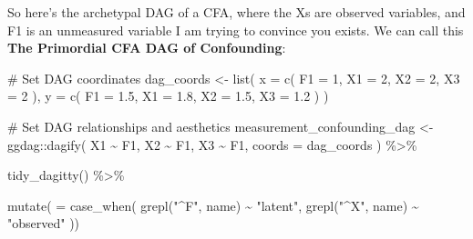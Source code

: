 \documentclass[
  letterpaper,
  DIV=11,
  numbers=noendperiod]{scrreprt}
\newenvironment{Shaded}{\begin{snugshade}}{\end{snugshade}}
\newcommand{\AttributeTok}[1]{\textcolor[rgb]{0.40,0.45,0.13}{#1}}
\newcommand{\CommentTok}[1]{\textcolor[rgb]{0.37,0.37,0.37}{#1}}
\newcommand{\DecValTok}[1]{\textcolor[rgb]{0.68,0.00,0.00}{#1}}
\newcommand{\FloatTok}[1]{\textcolor[rgb]{0.68,0.00,0.00}{#1}}
\newcommand{\FunctionTok}[1]{\textcolor[rgb]{0.28,0.35,0.67}{#1}}
\newcommand{\NormalTok}[1]{\textcolor[rgb]{0.00,0.23,0.31}{#1}}
\newcommand{\OtherTok}[1]{\textcolor[rgb]{0.00,0.23,0.31}{#1}}
\newcommand{\SpecialCharTok}[1]{\textcolor[rgb]{0.37,0.37,0.37}{#1}}
\newcommand{\StringTok}[1]{\textcolor[rgb]{0.13,0.47,0.30}{#1}}
\begin{document}
So here's the archetypal DAG of a CFA, where the Xs are observed
variables, and F1 is an unmeasured variable I am trying to convince you
exists. We can call this \textbf{The Primordial CFA DAG of Confounding}:

\begin{Shaded}
\begin{Highlighting}[]
\CommentTok{\# Set DAG coordinates}
\NormalTok{dag\_coords }\OtherTok{\textless{}{-}} \FunctionTok{list}\NormalTok{(}
  \AttributeTok{x =} \FunctionTok{c}\NormalTok{(}
    \AttributeTok{F1 =} \DecValTok{1}\NormalTok{, }
    \AttributeTok{X1 =} \DecValTok{2}\NormalTok{,}
    \AttributeTok{X2 =} \DecValTok{2}\NormalTok{,}
    \AttributeTok{X3 =} \DecValTok{2}
\NormalTok{  ),}
  \AttributeTok{y =} \FunctionTok{c}\NormalTok{(}
    \AttributeTok{F1 =} \FloatTok{1.5}\NormalTok{,}
    \AttributeTok{X1 =} \FloatTok{1.8}\NormalTok{,}
    \AttributeTok{X2 =} \FloatTok{1.5}\NormalTok{,}
    \AttributeTok{X3 =} \FloatTok{1.2}
\NormalTok{  )}
\NormalTok{)}

\CommentTok{\# Set DAG relationships and aesthetics}
\NormalTok{measurement\_confounding\_dag }\OtherTok{\textless{}{-}}\NormalTok{ ggdag}\SpecialCharTok{::}\FunctionTok{dagify}\NormalTok{(}
\NormalTok{  X1 }\SpecialCharTok{\textasciitilde{}}\NormalTok{ F1,}
\NormalTok{  X2 }\SpecialCharTok{\textasciitilde{}}\NormalTok{ F1,}
\NormalTok{  X3 }\SpecialCharTok{\textasciitilde{}}\NormalTok{ F1,}
  \AttributeTok{coords =}\NormalTok{ dag\_coords}
\NormalTok{) }\SpecialCharTok{\%\textgreater{}\%} 
  
  \FunctionTok{tidy\_dagitty}\NormalTok{() }\SpecialCharTok{\%\textgreater{}\%} 
  
  \FunctionTok{mutate}\NormalTok{(}
    \StringTok{\textasciigrave{}}\AttributeTok{ }\StringTok{\textasciigrave{}} \OtherTok{=} \FunctionTok{case\_when}\NormalTok{(}
      \FunctionTok{grepl}\NormalTok{(}\StringTok{"\^{}F"}\NormalTok{, name) }\SpecialCharTok{\textasciitilde{}} \StringTok{"latent"}\NormalTok{,}
      \FunctionTok{grepl}\NormalTok{(}\StringTok{"\^{}X"}\NormalTok{, name) }\SpecialCharTok{\textasciitilde{}} \StringTok{"observed"}
\NormalTok{    ))}


\end{Highlighting}
\end{Shaded}
\end{document}
